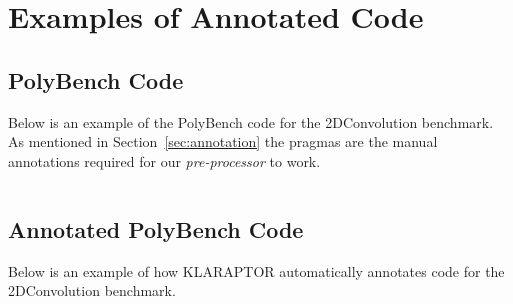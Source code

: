\chapter{Examples of Annotated Code}
\label{AppA}



\section{PolyBench Code}
Below is an example of the PolyBench code for the 2DConvolution benchmark. 
As mentioned in Section~\ref{sec:annotation} the pragmas are the manual annotations 
required for our \textit{pre-processor} to work.
\inputminted[linenos,breaklines]{cuda}{code/2DConvolution.cu}

\section{Annotated PolyBench Code}
Below is an example of how KLARAPTOR automatically annotates code for the 2DConvolution benchmark.
\inputminted[linenos,breaklines]{cuda}{code/2DConvolution_driver_call.cu}

